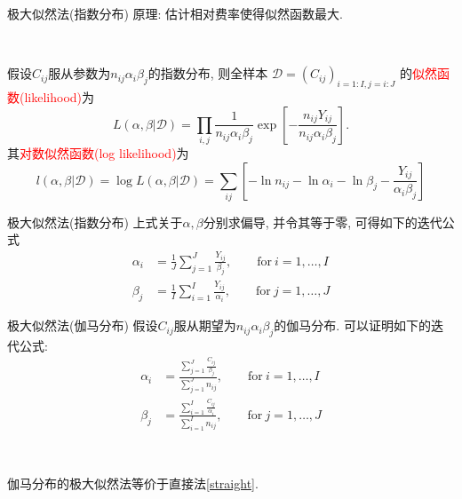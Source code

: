 \documentclass[professionalfont]{beamer}
\newcommand{\red}[1]{\textcolor{red}{#1}}
\begin{document}
\begin{frame}{极大似然法(指数分布)}
	原理: 估计相对费率使得似然函数最大.
	
	
	~
	
	假设$C_{ij}$服从参数为$n_{ij}\alpha_i\beta_j$的指数分布, 则全样本 $\mathcal{D}=(C_{ij})_{i=1:I,j=i:J}$ 的\red{似然函数(likelihood)}为
	$$L(\alpha,\beta|\mathcal{D})=\prod_{i,j}\frac{1}{n_{ij}\alpha_i\beta_j}\exp\left[-\frac{n_{ij}Y_{ij}}{n_{ij}\alpha_i\beta_j}\right].$$
	其\red{对数似然函数(log likelihood)}为$$l(\alpha,\beta|\mathcal{D})=\log L(\alpha,\beta|\mathcal{D})=\sum_{ij}\left[-\ln n_{ij}-\ln\alpha_i-\ln\beta_j-\frac{Y_{ij}}{\alpha_i\beta_j}\right]$$
\end{frame}

\begin{frame}{极大似然法(指数分布)}
	上式关于$\alpha,\beta$分别求偏导, 并令其等于零, 可得如下的迭代公式
	\begin{equation}\label{likelihood1}
	\begin{aligned}
	\alpha_i&=\frac{1}{J}\sum_{j=1}^J\frac{Y_{ij}}{\beta_j},\qquad \text{for} ~ i=1,\ldots,I\\
	\beta_j&=\frac{1}{I}\sum_{i=1}^I\frac{Y_{ij}}{\alpha_i},\qquad \text{for} ~ j=1,\ldots,J
	\end{aligned}
	\end{equation}
\end{frame}
\begin{frame}{极大似然法(伽马分布)}
	假设$C_{ij}$服从期望为$n_{ij}\alpha_i\beta_j$的伽马分布. 可以证明如下的迭代公式:
		\begin{equation}\label{likelihood2}
		\begin{aligned}
		\alpha_i&=\frac{\sum_{j=1}^J\frac{C_{ij}}{\beta_j}}{\sum_{j=1}^Jn_{ij}},\qquad \text{for} ~ i=1,\ldots,I\\
		\beta_j&=\frac{\sum_{i=1}^I\frac{C_{ij}}{\alpha_i}}{\sum_{i=1}^In_{ij}},\qquad \text{for} ~ j=1,\ldots,J
		\end{aligned}
		\end{equation}
	
~

伽马分布的极大似然法等价于直接法\eqref{straight}.
\end{frame}
\end{document}
